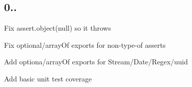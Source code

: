 \subsection*{0..}


\begin{DoxyItemize}
\item Fix {\ttfamily assert.\+object(null)} so it throws
\item Fix optional/array\+Of exports for non-\/type-\/of asserts
\item Add optiona/array\+Of exports for Stream/\+Date/\+Regex/uuid
\item Add basic unit test coverage 
\end{DoxyItemize}